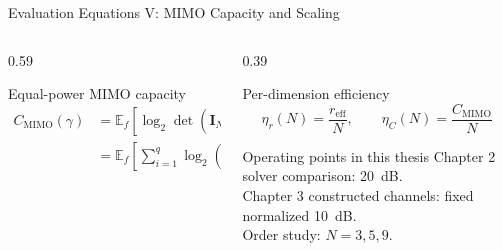 \begin{frame}[t]{Evaluation Equations V: MIMO Capacity and Scaling}
  \footnotesize
  \begin{columns}[T,onlytextwidth]
    \begin{column}{0.59\textwidth}
      \begin{block}{Equal-power MIMO capacity}
        \begin{align*}
          C_{\mathrm{MIMO}}(\gamma)
          &=\mathbb E_f\!\left[
            \log_2\det\!\left(
              \mathbf I_{N_R}+\frac{\gamma}{N_T}
              \mathbf H\mathbf H^H
            \right)\right]\\
          &=\mathbb E_f\!\left[
            \sum_{i=1}^{q}\log_2\!\left(
              1+\frac{\gamma}{N_T}\sigma_i^2(f)
            \right)\right].
        \end{align*}
      \end{block}
    \end{column}

    \begin{column}{0.39\textwidth}
      \begin{block}{Per-dimension efficiency}
        \begin{equation*}
          \eta_r(N)=\frac{r_{\mathrm{eff}}}{N},
          \qquad
          \eta_C(N)=\frac{C_{\mathrm{MIMO}}}{N}
        \end{equation*}
      \end{block}

      \begin{block}{Operating points in this thesis}
        \scriptsize
        Chapter 2 solver comparison: 20~dB.\\[0.5ex]
        Chapter 3 constructed channels: fixed normalized 10~dB.\\[0.5ex]
        Order study: $N=3,5,9$.
      \end{block}
    \end{column}
  \end{columns}

\end{frame}
